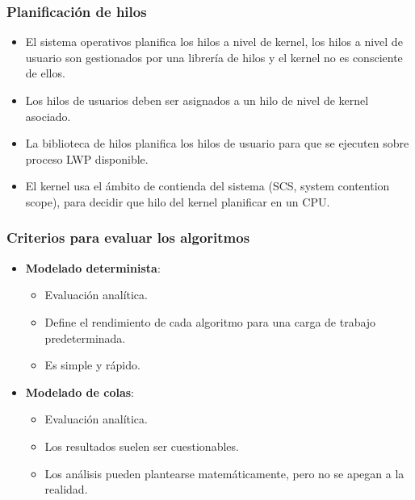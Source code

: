 \documentclass{beamer}
\begin{document}
\begin{frame}
	\frametitle{Planificación de hilos}
	
	\begin{itemize}
		\item El sistema operativos planifica los hilos a nivel de kernel, los
		hilos a nivel de usuario son gestionados por una librería de hilos y el kernel no es consciente
		de ellos.
		\item Los hilos de usuarios deben ser asignados a un hilo de nivel
		de kernel asociado.
		\item La biblioteca de hilos planifica los hilos de usuario para que se ejecuten sobre proceso LWP disponible.
		\item El kernel usa el ámbito de contienda del sistema (SCS, system contention scope), para decidir que hilo del kernel planificar en un CPU.
	\end{itemize}
\end{frame}


\begin{frame}
\frametitle{Criterios para evaluar los algoritmos}

\begin{itemize}
	\item \textbf{Modelado determinista}:
	\begin{itemize}
		\item Evaluación analítica.
		\item Define el rendimiento de cada algoritmo para una carga de trabajo predeterminada.
		\item Es simple y rápido.
	\end{itemize}
	\vspace{0.5cm}
	
	\item \textbf{Modelado de colas}:
	\begin{itemize}
		\item Evaluación analítica.
		\item Los resultados suelen ser cuestionables.
		\item Los análisis pueden plantearse matemáticamente, pero no se apegan a la realidad.
	\end{itemize}
\end{itemize}
\end{frame}
\end{document}
